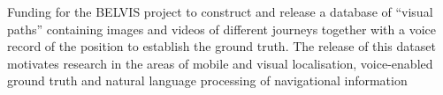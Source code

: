 Funding for the BELVIS project to construct and release a database of ``visual paths'' containing images and videos of different journeys together with a voice record of the position to establish the ground truth. The release of this dataset motivates research in the areas of mobile and visual localisation, voice-enabled ground truth and natural language processing of navigational information